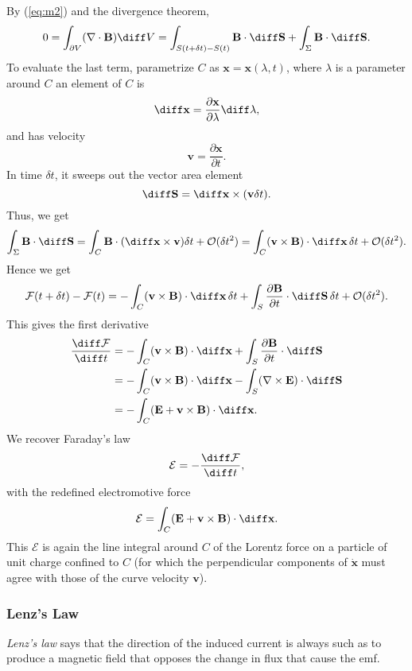 \documentclass[12pt]{article}
\begin{document}
By (\ref{eq:m2}) and the divergence theorem,
\[
0=  \int_{\partial V} (\nabla \cdot \mathbf{B}) \diff V = \int_{S(t+\delta t) - S(t)} \mathbf{B} \cdot \diff \mathbf{S} + \int_{\Sigma} \mathbf{B} \cdot \diff \mathbf{S}
.\]
To evaluate the last term, parametrize $C$ as $\mathbf{x}=  \mathbf{x}(\lambda, t)$, where $\lambda$ is a parameter around $C$ an element of $C$ is
\[
\diff \mathbf{x} = \frac{\partial \mathbf{x}}{\partial \lambda}\diff \lambda
,\]
and has velocity
\[
\mathbf{v} = \frac{\partial \mathbf{x}}{\partial t}
.\]
In time $\delta t$, it sweeps out the vector area element
\[
\diff \mathbf{S} = \diff \mathbf{x} \times (\mathbf{v} \delta t)
.\]
Thus, we get
\[
\int_{\Sigma}\mathbf{B} \cdot \diff \mathbf{S} = \int_{C} \mathbf{B} \cdot (\diff \mathbf{x} \times \mathbf{v}) \delta t + \mathcal{O}(\delta t^2) = \int_{C}(\mathbf{v} \times \mathbf{B})\cdot \diff \mathbf{x}\, \delta t + \mathcal{O}(\delta t^2)
.\]
Hence we get
\[
\mathcal{F}(t+\delta t) - \mathcal{F}(t) = -\int_{C}(\mathbf{v} \times \mathbf{B}) \cdot \diff \mathbf{x} \, \delta t + \int_{S} \frac{\partial \mathbf{B}}{\partial t} \cdot \diff \mathbf{S} \, \delta t + \mathcal{O}(\delta t^2)
.\]
This gives the first derivative
\begin{align*}
	\frac{\diff \mathcal{F}}{\diff t} &= - \int_{C}(\mathbf{v} \times \mathbf{B})\cdot \diff \mathbf{x} + \int_{S} \frac{\partial \mathbf{B}}{\partial t} \cdot \diff \mathbf{S} \\
					  &= - \int_{C}(\mathbf{v} \times \mathbf{B}) \cdot \diff \mathbf{x} - \int_{S}(\nabla \times \mathbf{E}) \cdot \diff \mathbf{S} \\
					  &= - \int_{C}(\mathbf{E} + \mathbf{v} \times \mathbf{B}) \cdot \diff \mathbf{x}.
\end{align*}
We recover Faraday's law
\[
	\mathcal{E} = - \frac{\diff \mathcal{F}}{\diff t}
,\]
with the redefined electromotive force
\[
\mathcal{E} = \int_{C}(\mathbf{E} + \mathbf{v} \times \mathbf{B}) \cdot \diff \mathbf{x}
.\]
This $\mathcal{E}$ is again the line integral around $C$ of the Lorentz force on a particle of unit charge confined to $C$ (for which the perpendicular components of $\mathbf{\dot x}$ must agree with those of the curve velocity $\mathbf{v}$).

\subsubsection{Lenz's Law}
\label{subsub:lenzs_law}

\emph{Lenz's law} says that the direction of the induced current is always such as to produce a magnetic field that opposes the change in flux that cause the emf.
\end{document}
